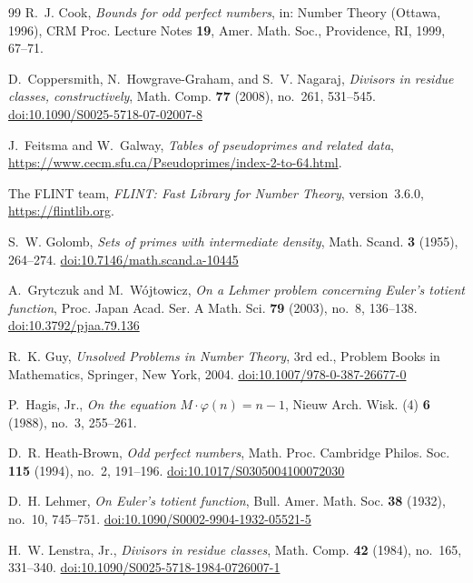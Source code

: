 \documentclass[11pt,reqno]{amsart}
\numberwithin{equation}{section}
\theoremstyle{plain}
\theoremstyle{definition}
\theoremstyle{remark}
\begin{document}
\begin{thebibliography}{99}
R.~J. Cook,
\emph{Bounds for odd perfect numbers},
in: Number Theory (Ottawa, 1996), CRM Proc. Lecture Notes \textbf{19},
Amer. Math. Soc., Providence, RI, 1999, 67--71.

D.~Coppersmith, N.~Howgrave-Graham, and S.~V. Nagaraj,
\emph{Divisors in residue classes, constructively},
Math. Comp. \textbf{77} (2008), no.~261, 531--545.
\href{https://doi.org/10.1090/S0025-5718-07-02007-8}{doi:10.1090/S0025-5718-07-02007-8}

J.~Feitsma and W.~Galway,
\emph{Tables of pseudoprimes and related data},
\url{https://www.cecm.sfu.ca/Pseudoprimes/index-2-to-64.html}.

The FLINT team,
\emph{FLINT: Fast Library for Number Theory}, version~3.6.0,
\url{https://flintlib.org}.

S.~W. Golomb,
\emph{Sets of primes with intermediate density},
Math. Scand. \textbf{3} (1955), 264--274.
\href{https://doi.org/10.7146/math.scand.a-10445}{doi:10.7146/math.scand.a-10445}

A.~Grytczuk and M.~W\'ojtowicz,
\emph{On a Lehmer problem concerning Euler's totient function},
Proc. Japan Acad. Ser. A Math. Sci. \textbf{79} (2003), no.~8, 136--138.
\href{https://doi.org/10.3792/pjaa.79.136}{doi:10.3792/pjaa.79.136}

R.~K. Guy,
\emph{Unsolved Problems in Number Theory}, 3rd ed.,
Problem Books in Mathematics, Springer, New York, 2004.
\href{https://doi.org/10.1007/978-0-387-26677-0}{doi:10.1007/978-0-387-26677-0}

P.~Hagis, Jr.,
\emph{On the equation $M\cdot\varphi(n)=n-1$},
Nieuw Arch. Wisk. (4) \textbf{6} (1988), no.~3, 255--261.

D.~R. Heath-Brown,
\emph{Odd perfect numbers},
Math. Proc. Cambridge Philos. Soc. \textbf{115} (1994), no.~2, 191--196.
\href{https://doi.org/10.1017/S0305004100072030}{doi:10.1017/S0305004100072030}

D.~H. Lehmer,
\emph{On Euler's totient function},
Bull. Amer. Math. Soc. \textbf{38} (1932), no.~10, 745--751.
\href{https://doi.org/10.1090/S0002-9904-1932-05521-5}{doi:10.1090/S0002-9904-1932-05521-5}

H.~W. Lenstra, Jr.,
\emph{Divisors in residue classes},
Math. Comp. \textbf{42} (1984), no.~165, 331--340.
\href{https://doi.org/10.1090/S0025-5718-1984-0726007-1}{doi:10.1090/S0025-5718-1984-0726007-1}


\end{thebibliography}
\end{document}

